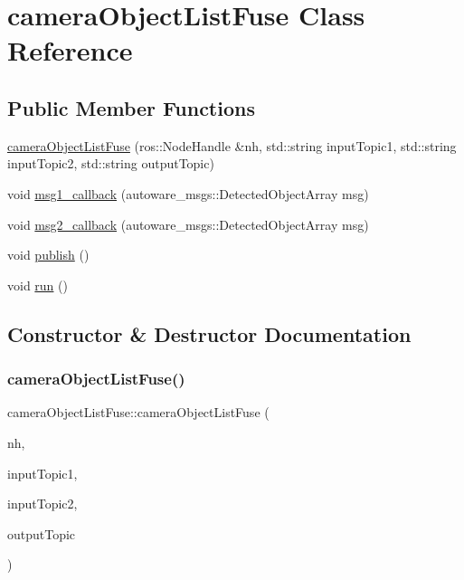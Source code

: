\hypertarget{classcameraObjectListFuse}{}\section{camera\+Object\+List\+Fuse Class Reference}
\label{classcameraObjectListFuse}
\subsection*{Public Member Functions}
\begin{DoxyCompactItemize}
\item 
\hyperlink{classcameraObjectListFuse_a065b74e641a96bbc9fe42d70f4ce714a}{camera\+Object\+List\+Fuse} (ros\+::\+Node\+Handle \&nh, std\+::string input\+Topic1, std\+::string input\+Topic2, std\+::string output\+Topic)
\item 
void \hyperlink{classcameraObjectListFuse_a0061000c1ef78f9999f71e25c4f09ced}{msg1\+\_\+callback} (autoware\+\_\+msgs\+::\+Detected\+Object\+Array msg)
\item 
void \hyperlink{classcameraObjectListFuse_ae1128999fc7081c2f676adec86903892}{msg2\+\_\+callback} (autoware\+\_\+msgs\+::\+Detected\+Object\+Array msg)
\item 
void \hyperlink{classcameraObjectListFuse_af817e51434ea2281046cb93777d5c4a6}{publish} ()
\item 
void \hyperlink{classcameraObjectListFuse_a5fd210063f120d23ce87f461cb8d4ebf}{run} ()
\end{DoxyCompactItemize}


\subsection{Constructor \& Destructor Documentation}
\mbox{\label{classcameraObjectListFuse_a065b74e641a96bbc9fe42d70f4ce714a}} 
\subsubsection{\texorpdfstring{camera\+Object\+List\+Fuse()}{cameraObjectListFuse()}}
{\footnotesize\ttfamily camera\+Object\+List\+Fuse\+::camera\+Object\+List\+Fuse (\begin{DoxyParamCaption}\item[{ros\+::\+Node\+Handle \&}]{nh,  }\item[{std\+::string}]{input\+Topic1,  }\item[{std\+::string}]{input\+Topic2,  }\item[{std\+::string}]{output\+Topic }\end{DoxyParamCaption})\hspace{0.3cm}{\ttfamily [inline]}}



